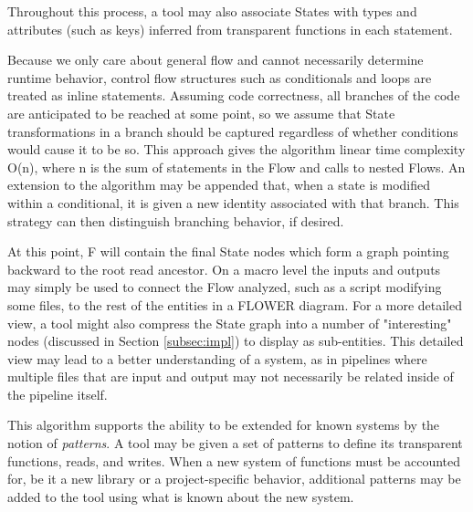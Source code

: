 \documentclass{llncs}
\newcommand{\+}{\discretionary{\mbox{${\bm\cdot}\mkern-1mu$}}{}{}}
\begin{document}
Throughout this process, a tool may also associate States with types and attributes (such as keys) inferred from transparent functions in each statement.

Because we only care about general flow and cannot necessarily determine runtime behavior, control flow structures such as conditionals and loops are treated as inline statements. Assuming code correctness, all branches of the code are anticipated to be reached at some point, so we assume that State transformations in a branch should be captured regardless of whether conditions would cause it to be so. This approach gives the algorithm linear time complexity O(n), where n is the sum of statements in the Flow and calls to nested Flows. An extension to the algorithm may be appended that, when a state is modified within a conditional, it is given a new identity associated with that branch. This strategy can then distinguish branching behavior, if desired.

At this point, F will contain the final State nodes which form a graph pointing backward to the root read ancestor. On a macro level the inputs and outputs may simply be used to connect the Flow analyzed, such as a script modifying some files, to the rest of the entities in a FLOWER diagram. For a more detailed view, a tool might also compress the State graph into a number of "interesting" nodes (discussed in Section \ref{subsec:impl}) to display as sub-entities. This detailed view may lead to a better understanding of a system, as in pipelines where multiple files that are input and output may not necessarily be related inside of the pipeline itself.

This algorithm supports the ability to be extended for known systems by the notion of \textit{patterns}. A tool may be given a set of patterns to define its transparent functions, reads, and writes. When a new system of functions must be accounted for, be it a new library or a project-specific behavior, additional patterns may be added to the tool using what is known about the new system.
\end{document}
